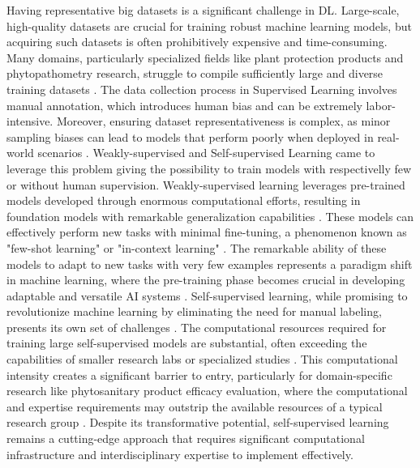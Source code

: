 \documentclass[12pt,a4paper,oneside]{report}
\begin{document}
Having representative big datasets is a significant challenge in DL. 
Large-scale, high-quality datasets are crucial for training robust machine learning models, but acquiring 
such datasets is often prohibitively expensive and time-consuming. Many domains, particularly specialized 
fields like plant protection products and phytopathometry research, 
struggle to compile sufficiently large and diverse training datasets 
\cite{alomStateoftheArtSurveyDeep2019}. The data collection process 
in Supervised Learning involves manual annotation, which introduces human bias and can be extremely labor-intensive. 
Moreover, ensuring dataset representativeness is complex, as minor sampling biases can lead to models 
that perform poorly when deployed in real-world scenarios \cite{torralbaUnbiasedLookDataset2011}.
Weakly-supervised and Self-supervised Learning came to leverage this problem giving the possibility
to train models with respectivelly few or without human supervision.
Weakly-supervised learning leverages pre-trained models developed through enormous computational efforts, 
resulting in foundation models with remarkable generalization capabilities \cite{radfordLearningTransferableVisual2021}. 
These models can effectively perform new tasks with minimal fine-tuning, a phenomenon known as 
"few-shot learning" or "in-context learning" \cite{brownLanguageModelsAre2020}. The remarkable ability of 
these models to adapt to new tasks with very few examples represents a paradigm shift in machine 
learning, where the pre-training phase becomes crucial in developing adaptable and versatile 
AI systems \cite{bommasaniOpportunitiesRisksFoundation2022}.
Self-supervised learning, while promising to revolutionize machine learning by eliminating 
the need for manual labeling, presents its own set of challenges \cite{heMomentumContrastUnsupervised2020}. 
The computational resources required for training large self-supervised models are substantial, 
often exceeding the capabilities of smaller research labs or specialized studies \cite{pattersonCarbonEmissionsLarge2021}. 
This computational intensity creates a significant barrier to entry, particularly for domain-specific 
research like phytosanitary product efficacy evaluation, where the computational and expertise 
requirements may outstrip the available resources of a typical research group 
\cite{strubellEnergyPolicyConsiderations2019}. Despite its transformative potential, self-supervised learning remains a 
cutting-edge approach that requires significant computational infrastructure and interdisciplinary expertise to implement effectively.
\end{document}
